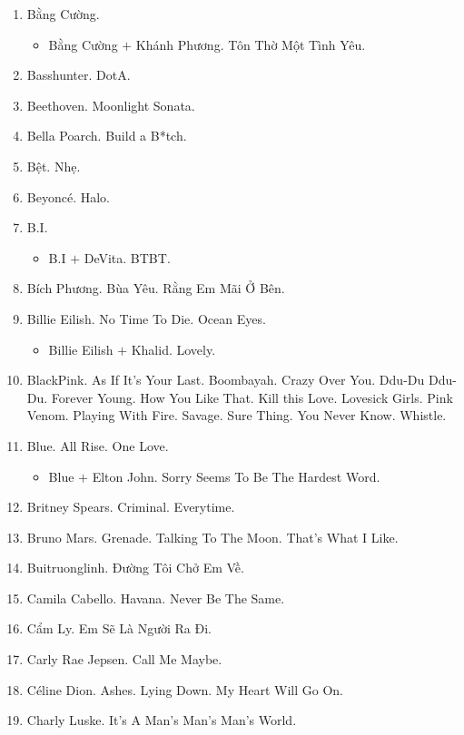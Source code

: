 \documentclass{article}
\begin{document}
\begin{enumerate}
\begin{itemize}
	\end{itemize}
	\item {\sc Bằng Cường.}
	\begin{itemize}
		\item {\sc Bằng Cường $+$ Khánh Phương.} Tôn Thờ Một Tình Yêu.
	\end{itemize}
	\item {\sc Basshunter.} DotA.
	\item {\sc Beethoven.} Moonlight Sonata.
	\item {\sc Bella Poarch.} Build a B*tch.
	\item {\sc Bệt.} Nhẹ.
	\item {\sc Beyonc\'e.} Halo.
	\item {\sc B.I.}
	\begin{itemize}
		\item {\sc B.I $+$ DeVita.} BTBT.
	\end{itemize}
	\item {\sc Bích Phương.} Bùa Yêu. Rằng Em Mãi Ở Bên.
	\item {\sc Billie Eilish.} No Time To Die. Ocean Eyes.
	\begin{itemize}
		\item {\sc Billie Eilish $+$ Khalid.} Lovely.
	\end{itemize}
	\item {\sc BlackPink.} As If It's Your Last. Boombayah. Crazy Over You. Ddu-Du Ddu-Du. Forever Young. How You Like That. Kill this Love. Lovesick Girls. Pink Venom. Playing With Fire. Savage. Sure Thing. You Never Know. Whistle.
	\item {\sc Blue.} All Rise. One Love.
	\begin{itemize}
		\item {\sc Blue $+$ Elton John.} Sorry Seems To Be The Hardest Word.
	\end{itemize}
	\item {\sc Britney Spears.} Criminal. Everytime.
	\item {\sc Bruno Mars.} Grenade. Talking To The Moon. That's What I Like.
	\item {\sc Buitruonglinh.} Đường Tôi Chở Em Về.
	\item {\sc Camila Cabello.} Havana. Never Be The Same.
	\item {\sc Cẩm Ly.} Em Sẽ Là Người Ra Đi.
	\item {\sc Carly Rae Jepsen.} Call Me Maybe.
	\item {\sc C\'eline Dion.} Ashes. Lying Down. My Heart Will Go On.
	\item {\sc Charly Luske.} It's A Man's Man's Man's World.

\end{enumerate}
\end{document}
